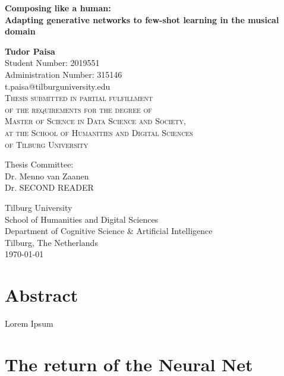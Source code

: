 \documentclass[a4paper]{book}
\begin{document}
\begin{titlepage}
    \begin{center}
        \huge\textbf{Composing like a human:} \\
        \Large\textbf{Adapting generative networks to few-shot learning in the musical domain}
        \normalsize

        \vspace{1cm}

        \textbf{Tudor Paisa}\\
        Student Number: 2019551 \\
        Administration Number: 315146\\
        t.paisa@tilburguniversity.edu\\

        \vspace{1cm}
        \textsc{Thesis submitted in partial fulfillment\\
        of the requirements for the degree of\\
        Master of Science in Data Science and Society,\\
        at the School of Humanities and Digital Sciences\\
        of Tilburg University\\}

        \vspace{2cm}
        Thesis Committee:\\
        Dr. Menno van Zaanen\\
        Dr. SECOND READER\\
        \vfill

        Tilburg University\\
        School of Humanities and Digital Sciences\\
        Department of Cognitive Science \& Artificial Intelligence\\
        Tilburg, The Netherlands\\
        \today
 
    \end{center}
\end{titlepage}

\chapter*{Abstract}
    Lorem Ipsum

\tableofcontents

\chapter{The return of the Neural Net}
\end{document}

